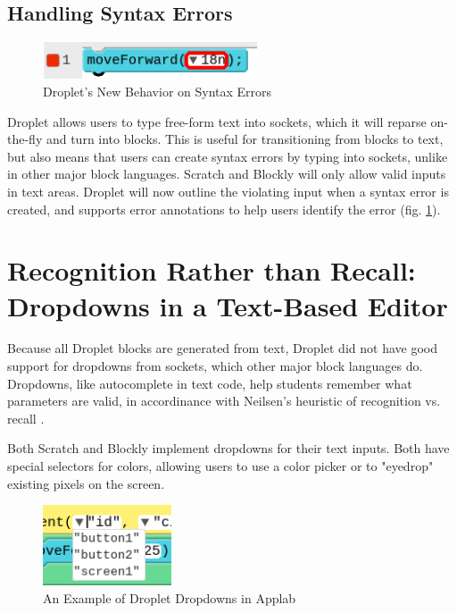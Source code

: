 \documentclass[conference]{IEEEtran}
\begin{document}
\subsection{Handling Syntax Errors}

\begin{figure}
\centering
\includegraphics[width=2.5in]{error-outline.png}
\caption{Droplet's New Behavior on Syntax Errors}
\label{error}
\end{figure}

Droplet allows users to type free-form text into sockets, which it will reparse on-the-fly and turn into blocks. This is useful for transitioning from blocks to text, but also means that users can create syntax errors by typing into sockets, unlike in other major block languages. Scratch and Blockly will only allow valid inputs in text areas. Droplet will now outline the violating input when a syntax error is created, and supports error annotations to help users identify the error (fig. \ref{error}).

\section{Recognition Rather than Recall: Dropdowns in a Text-Based Editor}

Because all Droplet blocks are generated from text, Droplet did not have good support for dropdowns from sockets, which other major block languages do. Dropdowns, like autocomplete in text code, help students remember what parameters are valid, in accordinance with Neilsen's heuristic of recognition vs. recall \cite{Neilsen}.

Both Scratch and Blockly implement dropdowns for their text inputs. Both have special selectors for colors, allowing users to use a color picker or to "eyedrop" existing pixels on the screen.

\begin{figure}
\centering
\includegraphics[width=1.5in]{dropdowns.png}
\caption{An Example of Droplet Dropdowns in Applab}
\label{dropdowns}
\end{figure}
\end{document}
